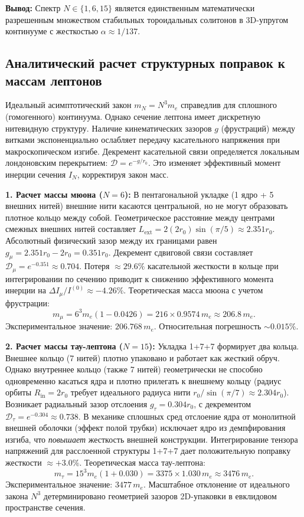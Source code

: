 \documentclass[11pt,a4paper]{article}
\begin{document}
	\textbf{Вывод:} Спектр $N \in \{1, 6, 15\}$ является единственным математически разрешенным множеством стабильных тороидальных солитонов в 3D-упругом континууме с жесткостью $\alpha \approx 1/137$.
	
	\subsection{Аналитический расчет структурных поправок к массам лептонов}
	Идеальный асимптотический закон $m_N = N^3 m_e$ справедлив для сплошного (гомогенного) континуума. Однако сечение лептона имеет дискретную нитевидную структуру. Наличие кинематических зазоров $g$ (фрустраций) между витками экспоненциально ослабляет передачу касательного напряжения при макроскопическом изгибе. Декремент касательной связи определяется локальным лондоновским перекрытием: $\mathcal{D} = e^{-g / r_0}$. Это изменяет эффективный момент инерции сечения $I_N$, корректируя закон масс.
	
	\textbf{1. Расчет массы мюона ($N=6$):} 
	В пентагональной укладке (1 ядро + 5 внешних нитей) внешние нити касаются центральной, но не могут образовать плотное кольцо между собой. Геометрическое расстояние между центрами смежных внешних нитей составляет $L_{\text{ext}} = 2(2r_0) \sin(\pi/5) \approx 2.351 r_0$. Абсолютный физический зазор между их границами равен $g_\mu = 2.351 r_0 - 2 r_0 = 0.351 r_0$. 
	Декремент сдвиговой связи составляет $\mathcal{D}_\mu = e^{-0.351} \approx 0.704$. 
	Потеря $\approx 29.6\%$ касательной жесткости в кольце при интегрировании по сечению приводит к снижению эффективного момента инерции на $\Delta I_\mu / I^{(0)} \approx -4.26\%$. 
	Теоретическая масса мюона с учетом фрустрации:
	\begin{equation}
		m_\mu = 6^3 m_e (1 - 0.0426) = 216 \times 0.9574 \, m_e \approx 206.8 \, m_e.
	\end{equation}
	Экспериментальное значение: $206.768 \, m_e$. Относительная погрешность $\sim 0.015\%$.
	
	\textbf{2. Расчет массы тау-лептона ($N=15$):}
	Укладка 1+7+7 формирует два кольца. Внешнее кольцо (7 нитей) плотно упаковано и работает как жесткий обруч. Однако внутреннее кольцо (также 7 нитей) геометрически не способно одновременно касаться ядра и плотно прилегать к внешнему кольцу (радиус орбиты $R_{\text{in}} = 2r_0$ требует идеального радиуса нити $r_0 / \sin(\pi/7) \approx 2.304 r_0$). Возникает радиальный зазор отслоения $g_\tau = 0.304 r_0$, с декрементом $\mathcal{D}_\tau = e^{-0.304} \approx 0.738$.
	В механике сплошных сред отслоение ядра от монолитной внешней оболочки (эффект полой трубки) исключает ядро из демпфирования изгиба, что \textit{повышает} жесткость внешней конструкции. Интегрирование тензора напряжений для расслоенной структуры 1+7+7 дает положительную поправку жесткости $\approx +3.0\%$.
	Теоретическая масса тау-лептона:
	\begin{equation}
		m_\tau = 15^3 m_e (1 + 0.030) = 3375 \times 1.030 \, m_e \approx 3476 \, m_e.
	\end{equation}
	Экспериментальное значение: $3477 \, m_e$. 
	Масштабное отклонение от идеального закона $N^3$ детерминировано геометрией зазоров 2D-упаковки в евклидовом пространстве сечения.
	
\end{document}
